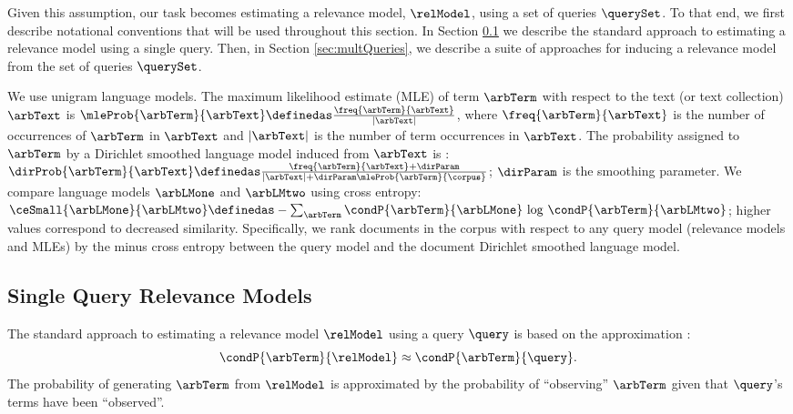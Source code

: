 Given this assumption, our task becomes estimating a relevance model,
$\relModel$, using a set of queries $\querySet$.
To that end, we first describe notational conventions that will be
used throughout this section.
In Section \ref{sec:singleQuery} we describe the standard approach to
estimating a relevance model using a single query.
Then, in Section \ref{sec:multQueries}, we describe a suite of
approaches for inducing a relevance model from the set of queries
$\querySet$.

We use unigram language models.
The maximum likelihood estimate (MLE) of term $\arbTerm$ with respect
to the text (or text collection) $\arbText$ is
$\mleProb{\arbTerm}{\arbText} \definedas
\frac{\freq{\arbTerm}{\arbText}}{\vert \arbText \vert}$, where
$\freq{\arbTerm}{\arbText}$ is the number of occurrences of
$\arbTerm$ in $\arbText$ and $\vert \arbText \vert$ is the number of
term occurrences in $\arbText$.
The probability assigned to $\arbTerm$ by a Dirichlet smoothed
language model induced from $\arbText$ is
\cite{Zhai+Lafferty:01a}: $ \dirProb{\arbTerm}{\arbText} \definedas
\frac{\freq{\arbTerm}{\arbText} + \dirParam}{\vert \arbText \vert +
\dirParam \mleProb{\arbTerm}{\corpus}}$; $\dirParam$ is the smoothing
parameter.
We compare language models $\arbLMone$ and $\arbLMtwo$ using 
cross entropy: $\ceSmall{\arbLMone}{\arbLMtwo} \definedas -
\sum_{\arbTerm}\condP{\arbTerm}{\arbLMone} ~{\log}~
\condP{\arbTerm}{\arbLMtwo}$; higher values correspond to decreased
similarity.
Specifically, we rank documents in the corpus with respect to any
query model (relevance models and MLEs) by the minus cross entropy
between the query model and the document Dirichlet smoothed language
model.


\subsection{Single Query Relevance Models}
\label{sec:singleQuery}
The standard approach to estimating a relevance model $\relModel$
using a query $\query$ is based on the approximation
\cite{Lavrenko+Croft:03a}:
\begin{equation}
\label{eq:basicApprox}
\condP{\arbTerm}{\relModel} \approx \condP{\arbTerm}{\query}.
\end{equation}
The probability of generating $\arbTerm$ from
$\relModel$ is approximated by the probability of ``observing''
$\arbTerm$ given that $\query$'s terms have been ``observed''.

